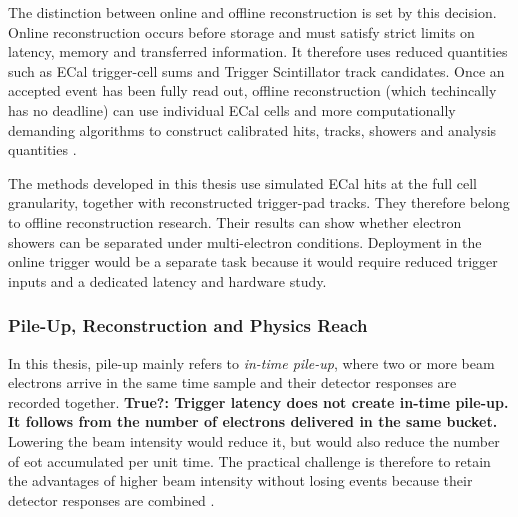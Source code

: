 The distinction between online and offline reconstruction is set by this
decision. Online reconstruction occurs before storage and must satisfy strict
limits on latency, memory and transferred information. It therefore uses
reduced quantities such as ECal trigger-cell sums and Trigger Scintillator
track candidates. Once an accepted event has been fully read out, offline
reconstruction (which techincally has no deadline) can use individual ECal cells and more computationally
demanding algorithms to construct calibrated hits, tracks, showers and
analysis quantities \cite{ldmx2025-overview}.


The methods developed in this thesis use simulated ECal hits at the full cell
granularity, together with reconstructed trigger-pad tracks. They
therefore belong to offline reconstruction research. Their results can show
whether electron showers can be separated under multi-electron conditions.
Deployment in the online trigger would be a separate task because it would
require reduced trigger inputs and a dedicated latency and hardware study.

\subsubsection{Pile-Up, Reconstruction and Physics Reach}
\label{sec:formalism}











In this thesis, \gls{pile-up} mainly refers to \emph{in-time pile-up}, where
two or more beam electrons arrive in the same time sample and their detector
responses are recorded together. 
\textbf{True?: Trigger latency does not create in-time pile-up. It follows from the number of electrons delivered in the same bucket.}
Lowering the beam intensity would reduce it, but would also
reduce the number of \gls{eot} accumulated per unit time. The practical
challenge is therefore to retain the advantages of higher beam intensity
without losing events because their detector responses are combined
\cite{ldmx2025-overview}.

